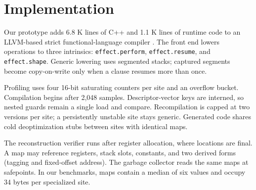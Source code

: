 \section{Implementation}
\label{sec:implementation}

Our prototype adds 6.8 K lines of C++ and 1.1 K lines of runtime code to an
LLVM-based strict functional-language compiler \cite{lattner2004llvm}. The
front end lowers operations to three intrinsics: \texttt{effect.perform},
\texttt{effect.resume}, and \texttt{effect.shape}. Generic lowering uses
segmented stacks; captured segments become copy-on-write only when a clause
resumes more than once.

Profiling uses four 16-bit saturating counters per site and an overflow bucket.
Compilation begins after 2,048 samples. Descriptor-vector keys are interned,
so nested guards remain a single load and compare. Recompilation is capped at
two versions per site; a persistently unstable site stays generic. Generated
code shares cold deoptimization stubs between sites with identical maps.

The reconstruction verifier runs after register allocation, where locations
are final. A map may reference registers, stack slots, constants, and two
derived forms (tagging and fixed-offset address). The garbage collector reads
the same maps at safepoints. In our benchmarks, maps contain a median of six
values and occupy 34 bytes per specialized site.
